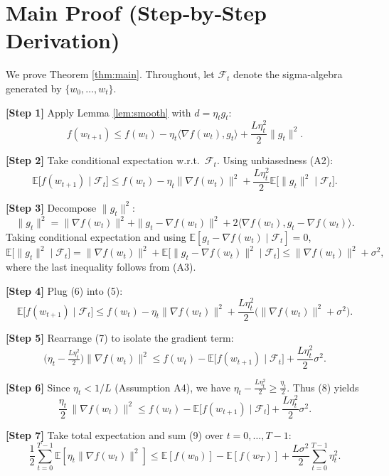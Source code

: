 \documentclass{article}
\newcommand{\EE}{\mathbb{E}}
\begin{document}
\section*{Main Proof (Step‑by‑Step Derivation)}
We prove Theorem \ref{thm:main}. Throughout, let $\mathcal{F}_{t}$ denote the sigma‑algebra generated by $\{w_{0},\dots,w_{t}\}$.

\noindent\textbf{[Step 1]} Apply Lemma \ref{lem:smooth} with $d=\eta_{t}g_{t}$:
\[
f(w_{t+1})\le f(w_{t})-\eta_{t}\langle\nabla f(w_{t}),g_{t}\rangle
               +\frac{L\eta_{t}^{2}}{2}\|g_{t}\|^{2}.
\tag{4}
\]

\noindent\textbf{[Step 2]} Take conditional expectation w.r.t.\ $\mathcal{F}_{t}$.
Using unbiasedness (A2):
\[
\EE\!\big[f(w_{t+1})\mid\mathcal{F}_{t}\big]
\le f(w_{t})-\eta_{t}\|\nabla f(w_{t})\|^{2}
   +\frac{L\eta_{t}^{2}}{2}\EE\!\big[\|g_{t}\|^{2}\mid\mathcal{F}_{t}\big].
\tag{5}
\]

\noindent\textbf{[Step 3]} Decompose $\|g_{t}\|^{2}$:
\[
\|g_{t}\|^{2}
 =\|\nabla f(w_{t})\|^{2}
   +\|g_{t}-\nabla f(w_{t})\|^{2}
   +2\langle\nabla f(w_{t}),g_{t}-\nabla f(w_{t})\rangle.
\]
Taking conditional expectation and using $\EE[g_{t}-\nabla f(w_{t})\mid\mathcal{F}_{t}]=0$,
\[
\EE\!\big[\|g_{t}\|^{2}\mid\mathcal{F}_{t}\big]
 =\|\nabla f(w_{t})\|^{2}
   +\EE\!\big[\|g_{t}-\nabla f(w_{t})\|^{2}\mid\mathcal{F}_{t}\big]
 \le\|\nabla f(w_{t})\|^{2}+\sigma^{2},
\tag{6}
\]
where the last inequality follows from (A3).

\noindent\textbf{[Step 4]} Plug (6) into (5):
\[
\EE\!\big[f(w_{t+1})\mid\mathcal{F}_{t}\big]
\le f(w_{t})-\eta_{t}\|\nabla f(w_{t})\|^{2}
   +\frac{L\eta_{t}^{2}}{2}\big(\|\nabla f(w_{t})\|^{2}+\sigma^{2}\big).
\tag{7}
\]

\noindent\textbf{[Step 5]} Rearrange (7) to isolate the gradient term:
\[
\big(\eta_{t}-\tfrac{L\eta_{t}^{2}}{2}\big)\|\nabla f(w_{t})\|^{2}
\le f(w_{t})-\EE\!\big[f(w_{t+1})\mid\mathcal{F}_{t}\big]
   +\frac{L\eta_{t}^{2}}{2}\sigma^{2}.
\tag{8}
\]

\noindent\textbf{[Step 6]} Since $\eta_{t}<1/L$ (Assumption A4), we have
$\eta_{t}-\frac{L\eta_{t}^{2}}{2}\ge\frac{\eta_{t}}{2}$.
Thus (8) yields
\[
\frac{\eta_{t}}{2}\,\|\nabla f(w_{t})\|^{2}
\le f(w_{t})-\EE\!\big[f(w_{t+1})\mid\mathcal{F}_{t}\big]
   +\frac{L\eta_{t}^{2}}{2}\sigma^{2}.
\tag{9}
\]

\noindent\textbf{[Step 7]} Take total expectation and sum (9) over $t=0,\dots,T-1$:
\[
\frac{1}{2}\sum_{t=0}^{T-1}\EE[\eta_{t}\|\nabla f(w_{t})\|^{2}]
\le \EE[f(w_{0})]-\EE[f(w_{T})]
   +\frac{L\sigma^{2}}{2}\sum_{t=0}^{T-1}\eta_{t}^{2}.
\tag{10}
\]
\end{document}
